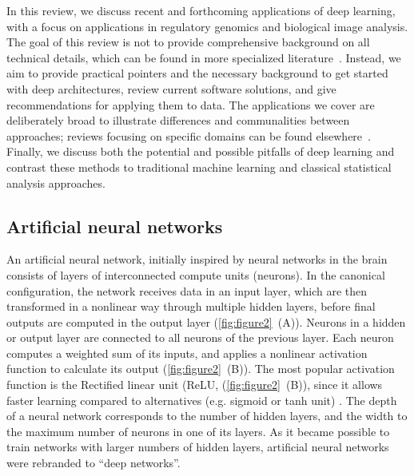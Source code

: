 In this review, we discuss recent and forthcoming applications of deep learning, with a focus on applications in regulatory genomics and biological image analysis. The goal of this review is not to provide comprehensive background on all technical details, which can be found in more specialized literature~\citep{bengio_practical_2012,bengio_representation_2013,deng_deep_2014,goodfellow_deep_2016,schmidhuber_deep_2015}. Instead, we aim to provide practical pointers and the necessary background to get started with deep architectures, review current software solutions, and give recommendations for applying them to data. The applications we cover are deliberately broad to illustrate differences and communalities between approaches; reviews focusing on specific domains can be found elsewhere~\citep{gawehn_deep_2016,leung_machine_2016,mamoshina_applications_2016,park_deep_2015}. Finally, we discuss both the potential and possible pitfalls of deep learning and contrast these methods to traditional machine learning and classical statistical analysis approaches.

\subsection{Artificial neural networks}
An artificial neural network, initially inspired by neural networks in the brain \citep{farley_simulation_1954,mcculloch_logical_1943,rosenblatt_perceptron:_1958} consists of layers of interconnected compute units (neurons). In the canonical configuration, the network receives data in an input layer, which are then transformed in a nonlinear way through multiple hidden layers, before final outputs are computed in the output layer (\autoref{fig:figure2}~(A)). Neurons in a hidden or output layer are connected to all neurons of the previous layer. Each neuron computes a weighted sum of its inputs, and applies a nonlinear activation function to calculate its output (\autoref{fig:figure2}~(B)). The most popular activation function is the Rectified linear unit (ReLU, (\autoref{fig:figure2}~(B)), since it allows faster learning compared to alternatives (e.g. sigmoid or tanh unit) \citep{glorot_deep_2011}. The depth of a neural network corresponds to the number of hidden layers, and the width to the maximum number of neurons in one of its layers. As it became possible to train networks with larger numbers of hidden layers, artificial neural networks were rebranded to ``deep networks''.

